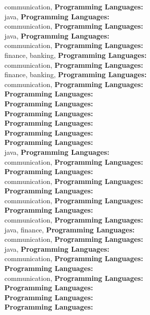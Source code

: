communication, \textbf{Programming Languages:} \\
java, \textbf{Programming Languages:} \\
communication, \textbf{Programming Languages:} \\
java, \textbf{Programming Languages:} \\
communication, \textbf{Programming Languages:} \\
finance, banking, \textbf{Programming Languages:} \\
communication, \textbf{Programming Languages:} \\
finance, banking, \textbf{Programming Languages:} \\
communication, \textbf{Programming Languages:} \\
\textbf{Programming Languages:} \\
\textbf{Programming Languages:} \\
\textbf{Programming Languages:} \\
\textbf{Programming Languages:} \\
\textbf{Programming Languages:} \\
\textbf{Programming Languages:} \\
java, \textbf{Programming Languages:} \\
communication, \textbf{Programming Languages:} \\
\textbf{Programming Languages:} \\
communication, \textbf{Programming Languages:} \\
\textbf{Programming Languages:} \\
communication, \textbf{Programming Languages:} \\
\textbf{Programming Languages:} \\
communication, \textbf{Programming Languages:} \\
java, finance, \textbf{Programming Languages:} \\
communication, \textbf{Programming Languages:} \\
java, \textbf{Programming Languages:} \\
communication, \textbf{Programming Languages:} \\
\textbf{Programming Languages:} \\
communication, \textbf{Programming Languages:} \\
\textbf{Programming Languages:} \\
\textbf{Programming Languages:} \\
\textbf{Programming Languages:} \\
